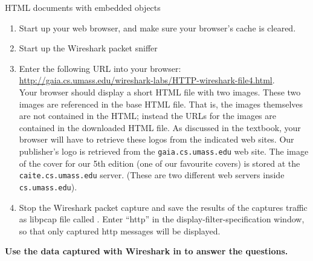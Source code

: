 \begin{exercise}{HTML documents with embedded objects}
\begin{enumerate}
	\item{Start up your web browser, and make sure your browser's cache is cleared.}
	\item{Start up the Wireshark packet sniffer}
	\item{Enter the following URL into your browser:\\ \url{http://gaia.cs.umass.edu/wireshark-labs/HTTP-wireshark-file4.html}.\\
	Your browser should display a short HTML file with two images. These two images are referenced in the base HTML file. That is, the images themselves are not contained in the HTML; instead the URLs for the images are contained in the downloaded HTML file. As discussed in the textbook, your browser will have to retrieve these logos from the indicated web sites. Our publisher's logo is retrieved from the \texttt{gaia.cs.umass.edu} web site. The image of the cover for our 5th edition (one of our favourite covers) is stored at the \texttt{caite.cs.umass.edu} server. (These are two different web servers inside \texttt{cs.umass.edu}).}
	\item{Stop the Wireshark packet capture and save the results of the captures traffic as libpcap file called . Enter ``http'' in the display-filter-specification window, so that only captured \ac{http} messages will be displayed.}
\end{enumerate}

\textbf{Use the data captured with Wireshark in  to answer the questions.}

\end{exercise}

